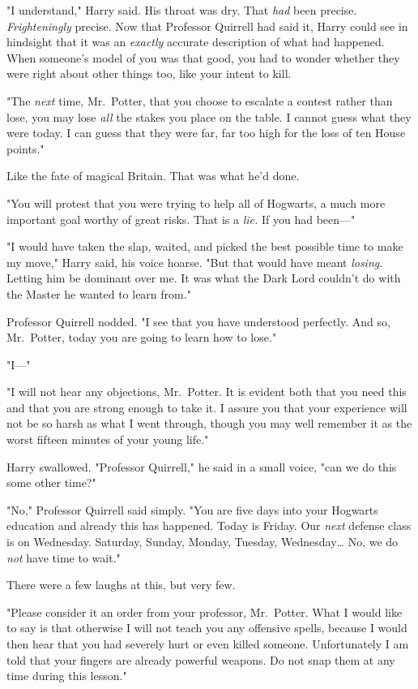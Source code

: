 "I understand," Harry said. His throat was dry. That \emph{had} been precise. 
\emph{Frighteningly} precise. Now that Professor Quirrell had said it, Harry 
could see in hindsight that it was an \emph{exactly} accurate description of 
what had happened. When someone's model of you was that good, you had to wonder 
whether they were right about other things too, like your intent to kill.

"The \emph{next} time, Mr.~Potter, that you choose to escalate a contest rather 
than lose, you may lose \emph{all} the stakes you place on the table. I cannot 
guess what they were today. I can guess that they were far, far too high for 
the loss of ten House points."

Like the fate of magical Britain. That was what he'd done.

"You will protest that you were trying to help all of Hogwarts, a much more 
important goal worthy of great risks. That is a \emph{lie.} If you had been---"

"I would have taken the slap, waited, and picked the best possible time to make 
my move," Harry said, his voice hoarse. "But that would have meant 
\emph{losing}. Letting him be dominant over me. It was what the Dark Lord 
couldn't do with the Master he wanted to learn from."

Professor Quirrell nodded. "I see that you have understood perfectly. And so, 
Mr.~Potter, today you are going to learn how to lose."

"I---"

"I will not hear any objections, Mr.~Potter. It is evident both that you need 
this and that you are strong enough to take it. I assure you that your 
experience will not be so harsh as what I went through, though you may well 
remember it as the worst fifteen minutes of your young life."

Harry swallowed. "Professor Quirrell," he said in a small voice, "can we do 
this some other time?"

"No," Professor Quirrell said simply. "You are five days into your Hogwarts 
education and already this has happened. Today is Friday. Our \emph{next} 
defense class is on Wednesday. Saturday, Sunday, Monday, Tuesday, 
Wednesday{\ldots} No, we do \emph{not} have time to wait."

There were a few laughs at this, but very few.

"Please consider it an order from your professor, Mr.~Potter. What I would like 
to say is that otherwise I will not teach you any offensive spells, because I 
would then hear that you had severely hurt or even killed someone. 
Unfortunately I am told that your fingers are already powerful weapons. Do not 
snap them at any time during this lesson."

